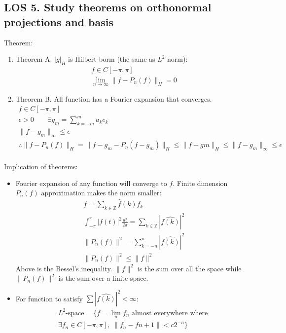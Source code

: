 \documentclass[12pt, a4paper]{article}
\begin{document}
\subsection*{LOS 5. Study theorems on orthonormal projections and basis}
Theorem:
\begin{enumerate}
    \item Theorem A. $|g|_H$ is Hilbert-borm (the same as $L^2$ norm):
    \begin{gather*}
        f \in C[-\pi, \pi]\\
        \lim_{n\rightarrow\infty}\|f - P_n(f)\|_H = 0
    \end{gather*}
    \item Theorem B. All function has a Fourier expansion that converges.
    \begin{gather*}
        f \in C[-\pi, \pi]\\
        \epsilon > 0 \qquad \exists g_m = \sum_{k = -m}^m a_ke_k\\
        \|f-g_m\|_\infty \leq \epsilon \\
        \therefore \|f-P_n(f)\|_H = \|f-g_m-P_n(f-g_m)\|_H \leq \|f-gm\|_H \leq \|f-g_m\|_\infty \leq \epsilon\\
    \end{gather*}
\end{enumerate}
Implication of theorems:
\begin{itemize}
    \item Fourier expansion of any function will converge to $f$. Finite dimension $P_n(f)$ approximation makes the norm smaller:
    \begin{gather*}
        f = \sum_{k \in \mathbb{Z}} \hat{f}(k)f_k\\
        \int_{-\pi}^\pi |f(t)|^2 \frac{dt}{2\pi} = \sum_{k \in \mathbb{Z}} |\hat{f(k)}|^2 \\
        \|P_n(f)\|^2 = \sum_{k=-n}^n |\hat{f(k)}|^2 \\
        \|P_n(f)\|^2 \leq \|f\|^2
    \end{gather*}
    Above is the Bessel's inequality. $\|f\|^2$ is the sum over all the space while $\|P_n(f)\|^2$ is the sum over a finite space.
    \item For function to satisfy $\sum |\hat{f(k)}|^2 < \infty$:
    \begin{align*}
        L^2 \text{-space} = \{f = \lim_{n}f_n \text{ almost everywhere where } \\\exists f_n \in C[-\pi, \pi] , \; \|f_n-f{n+1}\| < c2^{-n}\}
    \end{align*}
\end{itemize}
\vspace{0.3em}
\end{document}
